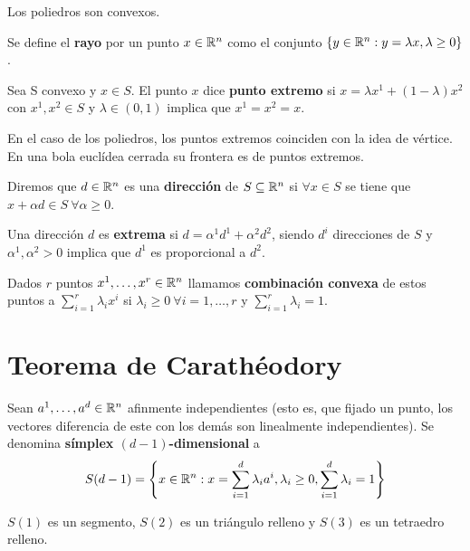\documentclass[PM.tex]{subfiles}
\begin{document}
\begin{coro}
Los poliedros son convexos.
\end{coro}

\begin{defi}
Se define el \textbf{rayo} por un punto $x\in\mathbb{R}^n$ como el conjunto $\left\{y\in\mathbb{R}^n: y=\lambda x, \lambda\geq 0\right\}$.
\end{defi}

\begin{defi}
Sea S convexo y $x\in S$. El punto $x$ dice \textbf{punto extremo} si $x=\lambda x^1 +(1-\lambda)x^2$ con $x^1,x^2\in S$ y $\lambda\in (0,1)$ implica que $x^1=x^2=x$.
\end{defi}
\begin{nota}  En el caso de los poliedros, los puntos extremos coinciden con la idea de vértice. En una bola euclídea cerrada su frontera es de puntos extremos.
\end{nota}

\begin{defi}
Diremos que $d\in\mathbb{R}^n$ es una \textbf{dirección} de $S\subseteq\mathbb{R}^n$ si $\forall x\in S$ se tiene que $x+\alpha d\in S\ \forall\alpha\geq 0$.
\end{defi}

\begin{defi} Una dirección $d$ es \textbf{extrema} si $d=\alpha^1d^1+\alpha^2d^2$, siendo $d^i$ direcciones de $S$ y $\alpha^1,\alpha^2>0$ implica que $d^1$ es proporcional a $d^2$.
\end{defi}

\begin{defi}
Dados $r$ puntos $x^1,\dots, x^r\in\mathbb{R}^n$ llamamos \textbf{combinación convexa} de estos puntos a $\sum_{i=1}^r\lambda_i x^i$ si $\lambda_i\geq 0\ \forall i=1,\dots, r$ y $\sum_{i=1}^r\lambda_i=1$.
\end{defi}

\section{Teorema de Carathéodory}
\begin{defi} Sean $a^1,\dots, a^d\in\mathbb{R}^n$ afinmente independientes (esto es, que fijado un punto, los vectores diferencia de este con los demás son linealmente independientes). Se denomina \textbf{símplex $(d-1)$-dimensional} a 
\[
S(d-1)= \left\{x\in\mathbb{R}^n:x=\sum_{i=1}^d\lambda_i a^i,\lambda_i\geq 0, \sum_{i=1}^d\lambda_i =1\right\}
\]
\end{defi}
\begin{example}
$S(1)$ es un segmento, $S(2)$ es un triángulo relleno y $S(3)$ es un tetraedro relleno.
\end{example}
\end{document}
